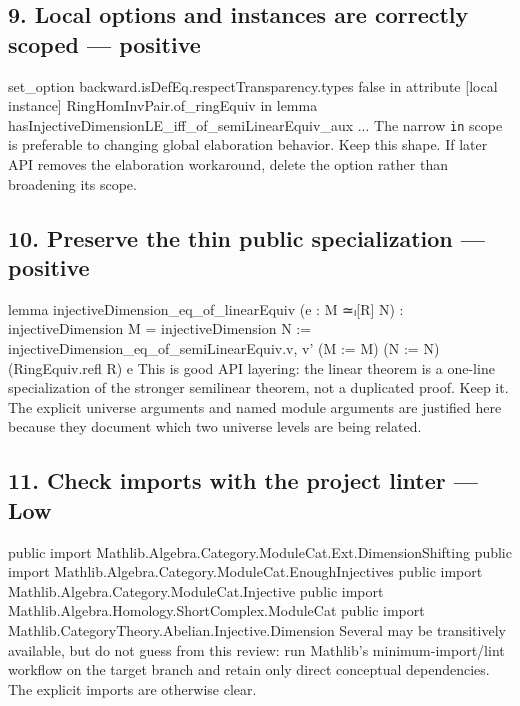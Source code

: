 \documentclass[10pt]{article}
\newenvironment{lean}{\Verbatim[fontsize=\scriptsize,frame=single,framesep=2mm,formatcom=\leanfont]}{\endVerbatim}
\newcommand{\low}{\textbf{Low}}
\begin{document}
\subsection*{9. Local options and instances are correctly scoped --- positive}
\begin{lean}
set_option backward.isDefEq.respectTransparency.types false in
attribute [local instance] RingHomInvPair.of_ringEquiv in
lemma hasInjectiveDimensionLE_iff_of_semiLinearEquiv_aux ...
\end{lean}
The narrow \texttt{in} scope is preferable to changing global elaboration behavior. Keep this shape.
If later API removes the elaboration workaround, delete the option rather than broadening its scope.

\subsection*{10. Preserve the thin public specialization --- positive}
\begin{lean}
lemma injectiveDimension_eq_of_linearEquiv (e : M ≃ₗ[R] N) :
    injectiveDimension M = injectiveDimension N :=
  injectiveDimension_eq_of_semiLinearEquiv.{v, v'}
    (M := M) (N := N) (RingEquiv.refl R) e
\end{lean}
This is good API layering: the linear theorem is a one-line specialization of the stronger semilinear
theorem, not a duplicated proof. Keep it. The explicit universe arguments and named module arguments
are justified here because they document which two universe levels are being related.

\subsection*{11. Check imports with the project linter --- \low}
\begin{lean}
public import Mathlib.Algebra.Category.ModuleCat.Ext.DimensionShifting
public import Mathlib.Algebra.Category.ModuleCat.EnoughInjectives
public import Mathlib.Algebra.Category.ModuleCat.Injective
public import Mathlib.Algebra.Homology.ShortComplex.ModuleCat
public import Mathlib.CategoryTheory.Abelian.Injective.Dimension
\end{lean}
Several may be transitively available, but do not guess from this review: run Mathlib's
minimum-import/lint workflow on the target branch and retain only direct conceptual dependencies.
The explicit imports are otherwise clear.
\end{document}
